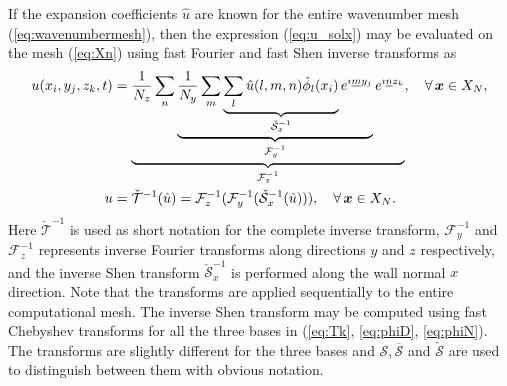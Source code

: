 \documentclass[11pt, oneside]{article}
\newcommand{\N}[1]{\check{#1}}
\newcommand{\D}[1]{\overline{#1}}
\begin{document}
If the expansion coefficients $\hat{u}$  are known for the entire wavenumber 
mesh (\ref{eq:wavenumbermesh}), then the expression (\ref{eq:u_solx}) may be 
evaluated on the mesh (\ref{eq:Xn}) using fast Fourier and fast Shen inverse 
transforms as
\begin{align}
u(x_i, y_j, z_k, t) &= \underbrace{\frac{1}{N_z}\sum_n 
\underbrace{\frac{1}{N_y} \sum_m \underbrace{\sum_l 
\hat{u}(l,m,n)\N{\phi}_l(x_i)}_{\N{\mathcal{S}}_x^{-1}} e^{\imath \underline{m} 
y_j}}_{\mathcal{F}_y^{-1}} e^{\imath \underline{n} z_k}}_{\mathcal{F}_z^{-1}} , 
\quad \forall \, \bm{x} \in X_N, \notag \\
  u &= \N{\mathcal{T}}^{-1}(\hat{u}) =  \mathcal{F}^{-1}_z (\mathcal{F}^{-1}_y 
  (\N{\mathcal{S}}^{-1}_x (\hat{u}))), \quad \forall \, \bm{x} \in X_N.  
  \label{eq:ifft} 
\end{align}
Here $\N{\mathcal{T}}^{-1}$ is used as short notation for the complete inverse 
transform, $\mathcal{F}_{y}^{-1}$ and $\mathcal{F}_{z}^{-1}$ represents inverse 
Fourier transforms along directions $y$ and $z$ respectively, and the inverse 
Shen transform $\N{\mathcal{S}}_{x}^{-1}$ is performed along the wall normal 
$x$ direction. Note that the transforms are applied sequentially to the entire 
computational mesh. The inverse Shen transform may be computed using fast 
Chebyshev transforms for all the three bases in (\ref{eq:Tk}, \ref{eq:phiD}, 
\ref{eq:phiN}). The transforms are slightly different for the three bases and 
${\mathcal{S}}, \D{\mathcal{S}}$ and $\N{\mathcal{S}}$ are used to distinguish 
between them with obvious notation. 
\end{document}
